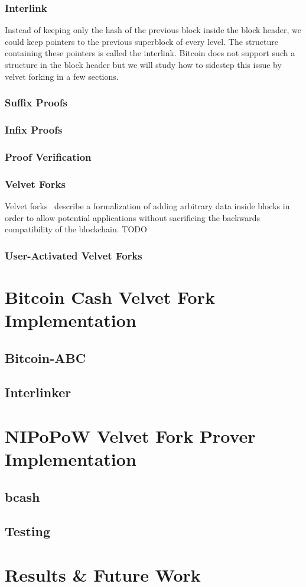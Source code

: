 \documentclass[11pt]{llncs}
\begin{document}
\subsubsection{Interlink}
Instead of keeping only the hash of the previous block inside the block header,
we could keep pointers to the previous superblock of every level. The structure
containing these pointers is called the interlink. Bitcoin does not support
such a structure in the block header but we will study how to sidestep this
issue by velvet forking in a few sections.

\subsubsection{Suffix Proofs}
\subsubsection{Infix Proofs}
\subsubsection{Proof Verification}
\subsubsection{Velvet Forks}
Velvet forks~\cite{nipopows,velvet} describe a formalization of adding
arbitrary data inside blocks in order to allow potential applications without
sacrificing the backwards compatibility of the blockchain. TODO

\subsubsection{User-Activated Velvet Forks}

\section{Bitcoin Cash Velvet Fork Implementation}

\subsection{Bitcoin-ABC}
\subsection{Interlinker}

\section{NIPoPoW Velvet Fork Prover Implementation}

\subsection{bcash}
\subsection{Testing}

\section{Results \& Future Work}


\end{document}
